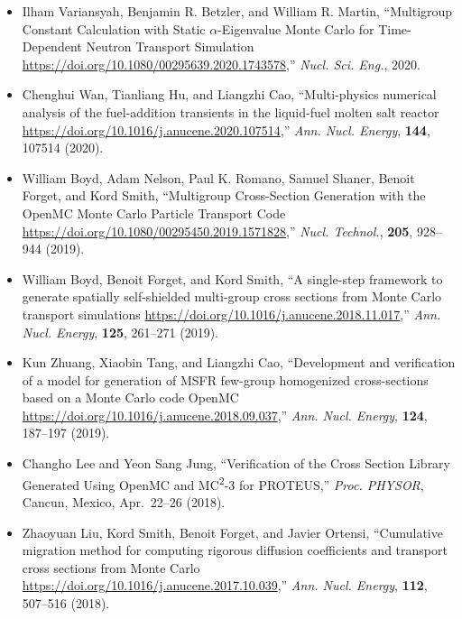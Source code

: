 \begin{itemize}

\item Ilham Variansyah, Benjamin R. Betzler, and William R. Martin, ``Multigroup
Constant Calculation with Static $\alpha$-Eigenvalue Monte Carlo for
Time-Dependent Neutron Transport Simulation
\url{https://doi.org/10.1080/00295639.2020.1743578},'' \textit{Nucl. Sci. Eng.}, 2020.

\item Chenghui Wan, Tianliang Hu, and Liangzhi Cao, ``Multi-physics numerical
analysis of the fuel-addition transients in the liquid-fuel molten salt reactor
\url{https://doi.org/10.1016/j.anucene.2020.107514},'' \textit{Ann. Nucl. Energy},
\textbf{144}, 107514 (2020).

\item William Boyd, Adam Nelson, Paul K. Romano, Samuel Shaner, Benoit Forget, and
Kord Smith, ``Multigroup Cross-Section Generation with the OpenMC Monte Carlo
Particle Transport Code \url{https://doi.org/10.1080/00295450.2019.1571828},''
\textit{Nucl. Technol.}, \textbf{205}, 928--944 (2019).

\item William Boyd, Benoit Forget, and Kord Smith, ``A single-step framework to
generate spatially self-shielded multi-group cross sections from Monte Carlo
transport simulations \url{https://doi.org/10.1016/j.anucene.2018.11.017},''
\textit{Ann. Nucl. Energy}, \textbf{125}, 261--271 (2019).

\item Kun Zhuang, Xiaobin Tang, and Liangzhi Cao, ``Development and verification of
a model for generation of MSFR few-group homogenized cross-sections based on a
Monte Carlo code OpenMC \url{https://doi.org/10.1016/j.anucene.2018.09.037},''
\textit{Ann. Nucl. Energy}, \textbf{124}, 187--197 (2019).

\item Changho Lee and Yeon Sang Jung, ``Verification of the Cross Section Library
Generated Using OpenMC and MC\textsuperscript{2}-3 for PROTEUS,'' \textit{Proc. PHYSOR}, Cancun,
Mexico, Apr.\ 22--26 (2018).

\item Zhaoyuan Liu, Kord Smith, Benoit Forget, and Javier Ortensi, ``Cumulative
migration method for computing rigorous diffusion coefficients and transport
cross sections from Monte Carlo
\url{https://doi.org/10.1016/j.anucene.2017.10.039},'' \textit{Ann. Nucl. Energy},
\textbf{112}, 507--516 (2018).


\end{itemize}
